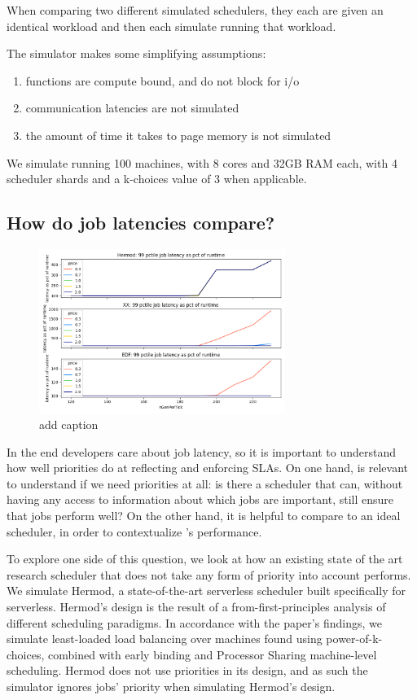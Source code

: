 When comparing two different simulated schedulers, they each are given an
identical workload and then each simulate running that workload.

The simulator makes some simplifying assumptions:
\begin{enumerate}
    \item functions are compute bound, and do not block for i/o
    \item communication latencies are not simulated
    \item the amount of time it takes to page memory is not simulated
\end{enumerate}

We simulate running 100 machines, with 8 cores and 32GB RAM each, with 4
scheduler shards and a k-choices value of 3 when applicable.

\subsection{How do job latencies compare?}

\begin{figure}[t!]
    \centering
      \includegraphics[width=8cm]{img/hermod_xx_edf_latency.png}
      \caption{ add caption }
    \label{fig:hermod-xx-edf}
\end{figure}

In the end developers care about job latency, so it is important to understand
how well priorities do at reflecting and enforcing SLAs. On one hand, is
relevant to understand if we need priorities at all: is there a scheduler that
can, without having any access to information about which jobs are important,
still ensure that jobs perform well? On the other hand, it is helpful to compare
\sys{} to an ideal scheduler, in order to contextualize \sys{}'s performance.

To explore one side of this question, we look at how an existing state of the
art research scheduler that does not take any form of priority into account
performs. We simulate Hermod\cite{TODO}, a state-of-the-art serverless scheduler
built specifically for serverless. Hermod's design is the result of a
from-first-principles analysis of different scheduling paradigms. In accordance
with the paper's findings, we simulate least-loaded load balancing over machines
found using power-of-k-choices, combined with early binding and Processor
Sharing machine-level scheduling. Hermod does not use priorities in its design,
and as such the simulator ignores jobs' priority when simulating Hermod's
design.


